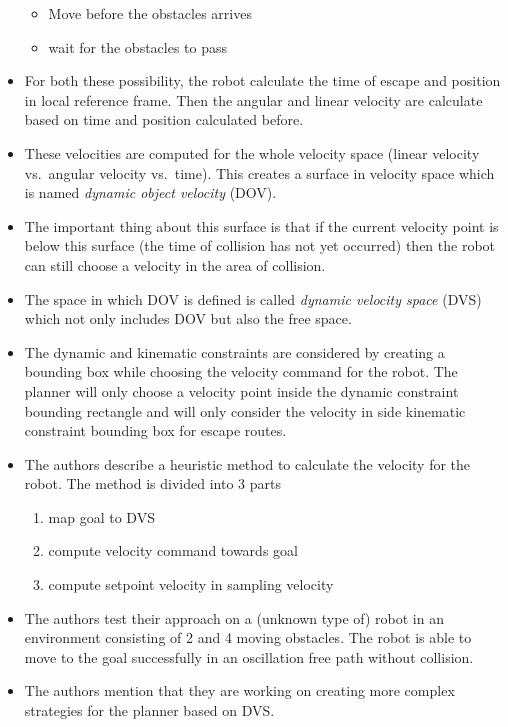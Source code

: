 \documentclass[12pt]{article}
\begin{document}
\begin{itemize}
        \begin{itemize}
            \item Move before the obstacles arrives
            \item wait for the obstacles to pass
        \end{itemize}
    \item For both these possibility, the robot calculate the time of escape and position in local reference frame. Then the angular and linear velocity are calculate based on time and position calculated before.
    \item These velocities are computed for the whole velocity space (linear velocity vs.\ angular velocity vs.\ time). This creates a surface in velocity space which is named \textit{dynamic object velocity} (DOV).
    \item The important thing about this surface is that if the current velocity point is below this surface (the time of collision has not yet occurred) then the robot can still choose a velocity in the area of collision.
    \item The space in which DOV is defined is called \textit{dynamic velocity space} (DVS) which not only includes DOV but also the free space.
    \item The dynamic and kinematic constraints are considered by creating a bounding box while choosing the velocity command for the robot. The planner will only choose a velocity point inside the dynamic constraint bounding rectangle and will only consider the velocity in side kinematic constraint bounding box for escape routes.
    \item The authors describe a heuristic method to calculate the velocity for the robot. The method is divided into 3 parts
        \begin{enumerate}
            \item map goal to DVS
            \item compute velocity command towards goal
            \item compute setpoint velocity in sampling velocity
        \end{enumerate}
    \item The authors test their approach on a (unknown type of) robot in an environment consisting of 2 and 4 moving obstacles. The robot is able to move to the goal successfully in an oscillation free path without collision.
    \item The authors mention that they are working on creating more complex strategies for the planner based on DVS\@.

\end{itemize}
\end{document}
